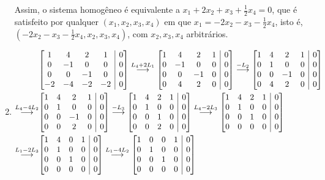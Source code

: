 \documentclass[12pt,a4paper]{article}
\makeatletter
\newenvironment{amatrix}[1]{%
  \left[\begin{array}{@{}*{#1}{c}|c@{}}
}{%
  \end{array}\right]
}
\newcommand{\grstep}[2][\relax]{%
   \ensuremath{\mathrel{
       {\mathop{\longrightarrow}\limits^{#2\mathstrut}_{
                                     \begin{subarray}{l} #1 \end{subarray}}}}}}
\makeatother
\begin{document}
\begin{ExerciseList}
\begin{enumerate}
Assim, o sistema homogêneo é equivalente a $x_1 + 2 x_2 + x_3 + \frac{1}{2}x_4 = 0$, que é satisfeito por qualquer $(x_1, x_2, x_3, x_4)$ em que $x_1 = -2 x_2 -x_3 - \frac{1}{2}x_4$, isto é, $(-2 x_2 -x_3 - \frac{1}{2}x_4, x_2, x_3, x_4)$, com $x_2,x_3,x_4$ arbitrários.
\item
\begin{align*}
& \begin{amatrix}{4}
 1 &  4 &  2 & 1 & 0\\
 0 & -1 &  0 & 0 & 0\\
 0 &  0 & -1 & 0 & 0\\
-2 & -4 & -2 & -2 & 0
\end{amatrix}
\grstep{ L_4 + 2 L_1 }
\begin{amatrix}{4}
 1 &  4 &  2 & 1 & 0\\
 0 & -1 &  0 & 0 & 0\\
 0 &  0 & -1 & 0 & 0\\
 0 &  4 &  2 & 0 & 0
\end{amatrix}
\grstep{ -L_2 }
\begin{amatrix}{4}
 1 & 4 &  2 & 1 & 0\\
 0 & 1 &  0 & 0 & 0\\
 0 & 0 & -1 & 0 & 0\\
 0 & 4 &  2 & 0 & 0
\end{amatrix}\\
\grstep{ L_4 - 4 L_2 }
& \begin{amatrix}{4}
 1 & 4 &  2 & 1 & 0\\
 0 & 1 &  0 & 0 & 0\\
 0 & 0 & -1 & 0 & 0\\
 0 & 0 &  2 & 0 & 0
\end{amatrix}
\grstep{ -L_3 }
\begin{amatrix}{4}
 1 & 4 & 2 & 1 & 0\\
 0 & 1 & 0 & 0 & 0\\
 0 & 0 & 1 & 0 & 0\\
 0 & 0 & 2 & 0 & 0
\end{amatrix}
\grstep{ L_4-2L_3 }
\begin{amatrix}{4}
 1 & 4 & 2 & 1 & 0\\
 0 & 1 & 0 & 0 & 0\\
 0 & 0 & 1 & 0 & 0\\
 0 & 0 & 0 & 0 & 0
\end{amatrix} \\
\grstep{ L_1-2L_3 }
&\begin{amatrix}{4}
 1 & 4 & 0 & 1 & 0\\
 0 & 1 & 0 & 0 & 0\\
 0 & 0 & 1 & 0 & 0\\
 0 & 0 & 0 & 0 & 0
\end{amatrix}
\grstep{ L_1-4L_2 }
\begin{amatrix}{4}
 1 & 0 & 0 & 1 & 0\\
 0 & 1 & 0 & 0 & 0\\
 0 & 0 & 1 & 0 & 0\\
 0 & 0 & 0 & 0 & 0
\end{amatrix}
\end{align*}


\end{enumerate}
\end{ExerciseList}
\end{document}
